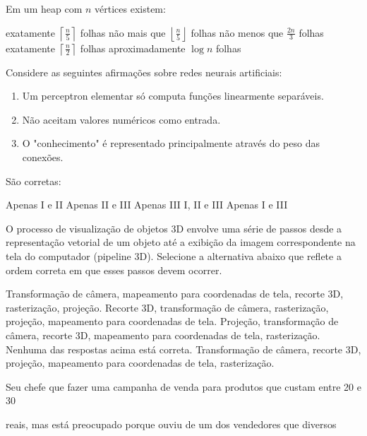 \documentclass[12pt, addpoints]{exam}
\begin{document}
\begin{questions}
\question

Em um heap com \( n \) vértices existem:
\begin{choices}
\choice exatamente \( \left\lceil \frac{n}{5} \right\rceil \) folhas
\choice não mais que \( \left\lfloor \frac{n}{5} \right\rfloor \) folhas
\choice não menos que \( \frac{2n}{3} \) folhas
\choice exatamente \( \left\lceil \frac{n}{2} \right\rceil \) folhas
\choice aproximadamente \( \log n \) folhas
\end{choices}

\question

Considere as seguintes afirmações sobre redes neurais artificiais: \begin{enumerate}[label=\Roman*.] \item Um perceptron elementar só computa funções linearmente separáveis. \item Não aceitam valores numéricos como entrada. \item O "conhecimento" é representado principalmente através do peso das conexões. \end{enumerate} São corretas:
\begin{choices}
\choice Apenas I e II 
\choice Apenas II e III
\choice Apenas III
\choice I, II e III
\choice Apenas I e III
\end{choices}

\question

O processo de visualização de objetos 3D envolve uma série de passos desde a representação vetorial de um objeto até a exibição da imagem correspondente na tela do computador (pipeline 3D). Selecione a alternativa abaixo que reflete a ordem correta em que esses passos devem ocorrer. 
\begin{choices}
\choice Transformação de câmera, mapeamento para coordenadas de tela, recorte 3D, rasterização, projeção. 
\choice Recorte 3D, transformação de câmera, rasterização, projeção, mapeamento para coordenadas de tela. 
\choice Projeção, transformação de câmera, recorte 3D, mapeamento para coordenadas de tela, rasterização. 
\choice Nenhuma das respostas acima está correta.
\choice Transformação de câmera, recorte 3D, projeção, mapeamento para coordenadas de tela, rasterização. 
\end{choices}

\question

Seu chefe que fazer uma campanha de venda para produtos que custam entre 20 e 30

reais, mas está preocupado porque ouviu de um dos vendedores que diversos


\end{questions}
\end{document}

